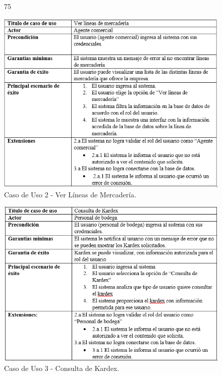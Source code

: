 \documentclass{scrreprt}
\begin{document}
\begin{figure}[!htpb]75
    \centerline{\includegraphics[scale=.50]{images/case_stiff/stuff2.png}}
    \caption{Caso de Uso 2 - Ver Líneas de Mercadería.}
    \label{fig}
\end{figure}
\FloatBarrier

\begin{figure}[!htpb]
    \centerline{\includegraphics[scale=.75]{images/case_stiff/stuff3.png}}
    \caption{Caso de Uso 3 - Consulta de Kardex.}
    \label{fig}
\end{figure}
\FloatBarrier
\end{document}
